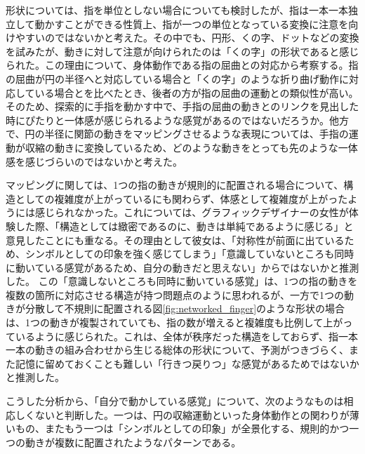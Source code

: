 形状については、指を単位としない場合についても検討したが、指は一本一本独立して動かすことができる性質上、指が一つの単位となっている変換に注意を向けやすいのではないかと考えた。その中でも、円形、くの字、ドットなどの変換を試みたが、動きに対して注意が向けられたのは「くの字」の形状であると感じられた。この理由について、身体動作である指の屈曲との対応から考察する。指の屈曲が円の半径へと対応している場合と「くの字」のような折り曲げ動作に対応している場合とを比べたとき、後者の方が指の屈曲の運動との類似性が高い。そのため、探索的に手指を動かす中で、手指の屈曲の動きとのリンクを見出した時にぴたりと一体感が感じられるような感覚があるのではないだろうか。他方で、円の半径に関節の動きをマッピングさせるような表現については、手指の運動が収縮の動きに変換しているため、どのような動きをとっても先のような一体感を感じづらいのではないかと考えた。



マッピングに関しては、1つの指の動きが規則的に配置される場合について、構造としての複雑度が上がっているにも関わらず、体感として複雑度が上がったようには感じられなかった。これについては、グラフィックデザイナーの女性が体験した際、「構造としては緻密であるのに、動きは単純であるように感じる」と意見したことにも重なる。その理由として彼女は、「対称性が前面に出ているため、シンボルとしての印象を強く感じてしまう」「意識していないところも同時に動いている感覚があるため、自分の動きだと思えない」からではないかと推測した。
この「意識しないところも同時に動いている感覚」は、1つの指の動きを複数の箇所に対応させる構造が持つ問題点のように思われるが、一方で1つの動きが分散して不規則に配置される図\ref{fig:networked_finger}のような形状の場合は、1つの動きが複製されていても、指の数が増えると複雑度も比例して上がっているように感じられた。これは、全体が秩序だった構造をしておらず、指一本一本の動きの組み合わせから生じる総体の形状について、予測がつきづらく、また記憶に留めておくことも難しい「行きつ戻りつ」な感覚があるためではないかと推測した。

こうした分析から、「自分で動かしている感覚」について、次のようなものは相応しくないと判断した。一つは、円の収縮運動といった身体動作との関わりが薄いもの、またもう一つは「シンボルとしての印象」が全景化する、規則的かつ一つの動きが複数に配置されたようなパターンである。

